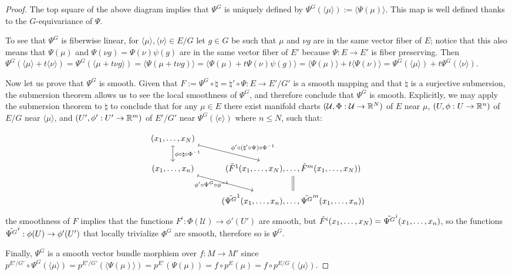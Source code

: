 \begin{proof}
The top square of the above diagram implies that $\Psi^{G}$ is uniquely defined by $\Psi^{G}(\langle \mu \rangle) := \langle \Psi(\mu) \rangle$. This map is well defined thanks to the $G$-equivariance of $\Psi$.

To see that $\Psi^G$ is fiberwise linear, for $\langle \mu \rangle, \langle \nu \rangle \in E/G$ let $g \in G$ be such that $\mu$ and $\nu g$ are in the same vector fiber of $E$; notice that this also means that $\Psi(\mu)$ and $\Psi(\nu g) = \Psi(\nu) \psi(g)$ are in the same vector fiber of $E'$ because $\Psi:E \to E'$ is fiber preserving. 
Then $\Psi^{G}(\langle \mu \rangle + t\langle \nu \rangle) = \Psi^{G}(\langle \mu  + t \nu g \rangle)  = \langle \Psi(\mu + t \nu g ) \rangle = \langle \Psi(\mu) + t \Psi(\nu)\psi(g) \rangle = \langle \Psi(\mu) \rangle + t \langle \Psi(\nu) \rangle = \Psi^{G}(\langle \mu \rangle) + t\Psi^{G}(\langle \nu \rangle)$.

Now let us prove that $\Psi^{G}$ is smooth. Given that $F := \Psi^{G} \circ \natural = \natural' \circ \Psi : E \to E'/G'$ is a smooth mapping and that $\natural$ is a surjective submersion, the submersion theorem allows us to see the local smoothness of $\Psi^{G}$, and therefore conclude that $\Psi^{G}$ is smooth. Explicitly, we may apply the submersion theorem to $\natural$  to conclude that for any $\mu \in E$ there exist manifold charts $(\mathcal U, \Phi: \mathcal U \to \mathbb{R}^N)$ of $E$ near $\mu$, $(U, \phi: U \to \RR^n)$ of $E/G$ near $\langle \mu \rangle$, and $(U', \phi': U' \to \RR^m)$ of $E'/G'$ near $\Psi^{G}(\langle e \rangle)$ where $n \leq N$, such that: %

\[
\begin{tikzcd}
    (x_1, \dots, x_N) \arrow[mapsto]{rd}{\phi' \circ (\natural' \circ \Psi) \circ \Phi^{-1} } \arrow[mapsto]{d}{\phi \circ \natural \circ \Phi^{-1}} & \\
    (x_1, \dots, x_n) \arrow[mapsto]{rd}[below, near start]{\phi' \circ \Psi^{G} \circ \phi^{-1}} & (\Tilde F^1(x_1, \dots, x_N), \dots, \Tilde F^m(x_1, \dots, x_N)) \arrow[equal]{d}\\
    & (\Tilde{\Psi^{G}}^1(x_1, \dots, x_n), \dots, \Tilde{\Psi^{G}}^m(x_1, \dots, x_n))
\end{tikzcd}
\]
the smoothness of $F$ implies that the functions $F^i:\Phi(\mathcal U) \to \phi'(U')$ are smooth, but $\Tilde F^i(x_1, \dots, x_N) = \Tilde{\Psi^{G}}^i(x_1, \dots, x_n)$, so the functions $\Tilde{\Psi^{G}}^i:\phi(U) \to \phi'(U')$ that locally trivialize $\Phi^{G}$ are smooth, therefore so is $\Psi^{G}$. 

Finally, $\Psi^{G}$ is a smooth vector bundle morphism over $f:M \to M'$ since $p^{E'/G'} \circ \Psi^{G}(\langle \mu \rangle) = p^{E'/G'}(\langle \Psi(\mu) \rangle) = p^{E'}(\Psi(\mu)) = f \circ p^E (\mu) = f \circ p^{E/G} (\langle \mu \rangle)$.

\end{proof}

